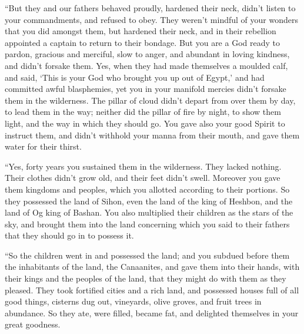  ``But they and our fathers behaved proudly, hardened their
neck, didn't listen to your commandments,  and refused to
obey. They weren't mindful of your wonders that you did amongst them,
but hardened their neck, and in their rebellion appointed a captain to
return to their bondage. But you are a God ready to pardon, gracious and
merciful, slow to anger, and abundant in loving kindness, and didn't
forsake them.  Yes, when they had made themselves a moulded
calf, and said, `This is your God who brought you up out of Egypt,' and
had committed awful blasphemies,  yet you in your manifold
mercies didn't forsake them in the wilderness. The pillar of cloud
didn't depart from over them by day, to lead them in the way; neither
did the pillar of fire by night, to show them light, and the way in
which they should go.  You gave also your good Spirit to
instruct them, and didn't withhold your manna from their mouth, and gave
them water for their thirst.

 ``Yes, forty years you sustained them in the wilderness.
They lacked nothing. Their clothes didn't grow old, and their feet
didn't swell.  Moreover you gave them kingdoms and peoples,
which you allotted according to their portions. So they possessed the
land of Sihon, even the land of the king of Heshbon, and the land of Og
king of Bashan.  You also multiplied their children as the
stars of the sky, and brought them into the land concerning which you
said to their fathers that they should go in to possess it.

 ``So the children went in and possessed the land; and you
subdued before them the inhabitants of the land, the Canaanites, and
gave them into their hands, with their kings and the peoples of the
land, that they might do with them as they pleased.  They
took fortified cities and a rich land, and possessed houses full of all
good things, cisterns dug out, vineyards, olive groves, and fruit trees
in abundance. So they ate, were filled, became fat, and delighted
themselves in your great goodness.

